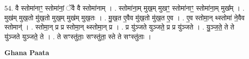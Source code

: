 \documentclass[17pt]{extarticle}
\begin{document}
54. वै स्तोमा॑नाꣳ॒॒ स्तोमा॑नां॒ ॅवै वै स्तोमा॑नाम् । . स्तोमा॑ना॒म् मुख॒म् मुखꣳ॒॒ स्तोमा॑नाꣳ॒॒ स्तोमा॑ना॒म् मुख᳚म् । . मुख॑म् मुख॒तो मु॑ख॒तो मुख॒म् मुख॑म् मुख॒तः । . मु॒ख॒त ए॒वैव मु॑ख॒तो मु॑ख॒त ए॒व । . ए॒व स्तोमा॒न् थ्स्तोमा॑ ने॒वैव स्तोमान्॑ । . स्तोमा॒न् प्र प्र स्तोमा॒न् थ्स्तोमा॒न् प्र । . प्र यु॑ञ्जते युञ्जते॒ प्र प्र यु॑ञ्जते । . यु॒ञ्ज॒ते॒ ते ते यु॑ञ्जते युञ्जते॒ ते । . ते सꣳस्तु॑ताः॒ सꣳस्तु॑ता॒ स्ते ते सꣳस्तु॑ताः । \newline

\textbf{Ghana Paata } \newline
\end{document}
